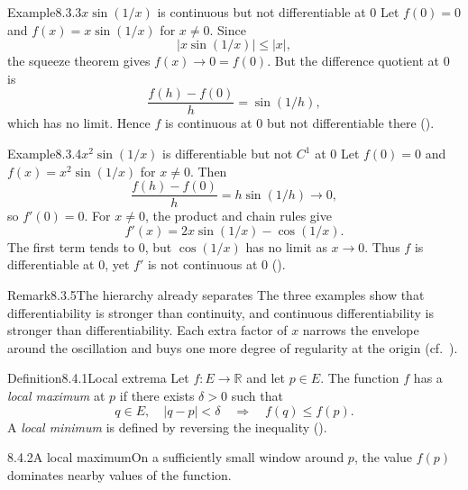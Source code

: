 \documentclass[main.tex]{subfiles}
\begin{document}
\begin{ObjL}{Example}{8.3.3}{$x\sin(1/x)$ is continuous but not differentiable at $0$}
Let $f(0)=0$ and $f(x)=x\sin(1/x)$ for $x\ne0$. Since
\[
  |x\sin(1/x)|\le |x|,
\]
the squeeze theorem gives $f(x)\to0=f(0)$. But the difference quotient at $0$ is
\[
  \frac{f(h)-f(0)}{h}=\sin(1/h),
\]
which has no limit. Hence $f$ is continuous at $0$ but not differentiable there ().
\end{ObjL}

\begin{ObjL}{Example}{8.3.4}{$x^2\sin(1/x)$ is differentiable but not $C^1$ at $0$}
Let $f(0)=0$ and $f(x)=x^2\sin(1/x)$ for $x\ne0$. Then
\[
  \frac{f(h)-f(0)}{h}=h\sin(1/h)\longrightarrow0,
\]
so $f'(0)=0$. For $x\ne0$, the product and chain rules give
\[
  f'(x)=2x\sin(1/x)-\cos(1/x).
\]
The first term tends to $0$, but $\cos(1/x)$ has no limit as $x\to0$. Thus $f$ is
differentiable at $0$, yet $f'$ is not continuous at $0$ ().
\end{ObjL}

\begin{ObjL}{Remark}{8.3.5}{The hierarchy already separates}
The three examples show that differentiability is stronger than continuity, and continuous
differentiability is stronger than differentiability. Each extra factor of $x$ narrows the
envelope around the oscillation and buys one more degree of regularity at the origin
(cf.\ ).
\end{ObjL}


\begin{Obj}{Definition}{8.4.1}{Local extrema}
Let $f:E\to\mathbb R$ and let $p\in E$. The function $f$ has a \emph{local maximum} at
$p$ if there exists $\delta>0$ such that
\[
  q\in E,\quad |q-p|<\delta
  \quad\Longrightarrow\quad
  f(q)\le f(p).
\]
A \emph{local minimum} is defined by reversing the inequality ().
\end{Obj}

\begin{Fig}{8.4.2}{A local maximum}{On a sufficiently small window around $p$, the value
$f(p)$ dominates nearby values of the function.}
\end{Fig}
\end{document}
